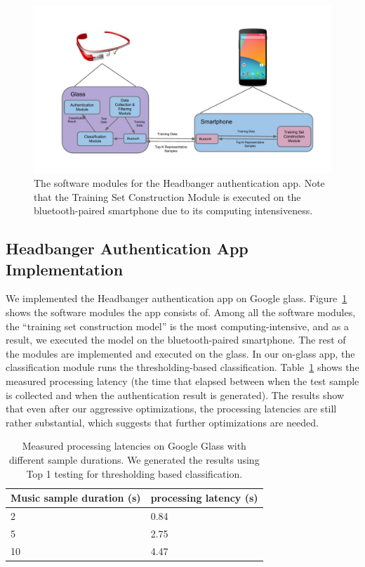 \begin{figure}[t]
\centering
\includegraphics [width=.85\linewidth]{../fig/sofware_architecture}
\caption{The software modules for the Headbanger authentication app. Note that the Training Set Construction Module is executed on the bluetooth-paired smartphone due to its computing intensiveness. \label{fig:software_arch}}
\end{figure}


\subsection{Headbanger Authentication App Implementation}
We implemented the Headbanger authentication app on Google glass. Figure~\ref{fig:software_arch} shows the software modules the app consists of. Among all the software modules, the ``training set construction model'' is the most computing-intensive, and as a result, we executed the model on the bluetooth-paired smartphone. The rest of the modules are implemented and executed on the glass. In our on-glass app, the classification module runs the thresholding-based classification. Table~\ref{tab:glass} shows the measured processing latency (the time that elapsed between when the test sample is collected and when the authentication result is generated). The results show that even after our aggressive optimizations, the processing latencies are still rather substantial, which suggests that further optimizations are needed.

\begin{table}[b]
\small\centering
\begin{tabular}{|l|l|}\hline
Music sample duration (s) & processing latency (s) \\\hline
2 & 0.84\\\hline
5 & 2.75 \\\hline
10 & 4.47 \\\hline
\end{tabular}
\caption{Measured processing latencies on Google Glass with different sample durations. We generated the results using Top 1 testing for thresholding based classification.\label{tab:glass}}
\end{table}



